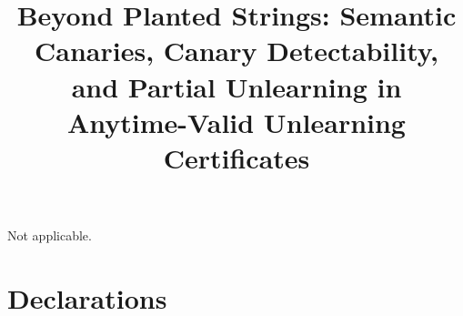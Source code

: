 \documentclass[pdflatex,sn-mathphys-num]{sn-jnl}
\theoremstyle{thmstyleone}
\theoremstyle{thmstyletwo}
\theoremstyle{thmstylethree}
\begin{document}
\title[Semantic Canaries and Partial Unlearning in Unlearning Certificates]{Beyond Planted
Strings: Semantic Canaries, Canary Detectability, and Partial Unlearning in Anytime-Valid
Unlearning Certificates}

\newif\ifanon
\anonfalse

\ifanon
\author*[1]{\sur{Anonymous Author}}
\affil*[1]{\orgname{Blinded for review}}
\else
\author*[1]{ }
\fi

\abstract{}


\maketitle











\backmatter

 Not applicable.

\section*{Declarations}
\end{document}
